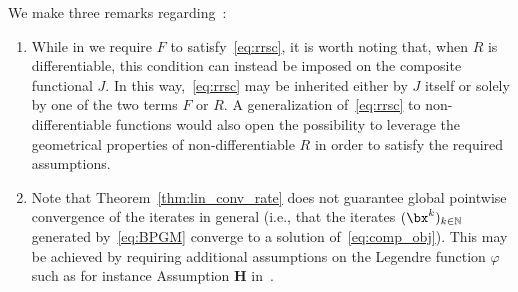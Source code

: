 \documentclass[11pt]{amsart}
\begin{document}
\begin{remark} We make three remarks regarding~:
\begin{enumerate}
\item[(a)] While in  we require $F$ to satisfy~\cref{eq:rrsc}, it is worth noting that, when $R$ is differentiable, this condition can instead be imposed on the composite functional $J$. In this way,~\cref{eq:rrsc} may be inherited either by $J$ itself or solely by one of the two terms $F$ or $R$. A generalization of~\cref{eq:rrsc} to non-differentiable functions would also open the possibility to leverage the geometrical properties of non-differentiable $R$ in order to satisfy the required assumptions. 
\item[(b)] 
Note that Theorem~\ref{thm:lin_conv_rate} does not guarantee global pointwise convergence of the iterates in general (i.e., that the iterates $(\bx^k)_{k\in\mathbb{N}}$ generated by~\cref{eq:BPGM} converge to a solution of~\cref{eq:comp_obj}). This may be achieved by requiring additional assumptions on the Legendre function $\varphi$ such as for instance Assumption $\mathbf{H}$ in~\cite{bauschke2017descent, Teboulle2018}.


\end{enumerate}
\end{remark}
\end{document}
